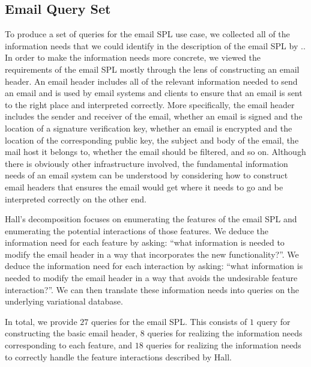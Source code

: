 \subsection{Email Query Set}
\label{sec:enron-qs}


To produce a set of queries for the email SPL use case, we collected all of
the information needs that we could identify in the description of the email
SPL by \citet{Hall05}.. In order to make the information needs more concrete, we
viewed the requirements of the email SPL mostly through the lens of
constructing an email header.
%
An email header includes all of the relevant information needed to send an
email and is used by email systems and clients to ensure that an email is sent to
the right place and interpreted correctly. 
More specifically, the email header
includes the sender and receiver of the email, whether an email is signed and
the location of a signature verification key, whether an email is encrypted and
the location of the corresponding public key, the subject and body of the
email, the mail host it belongs to, whether the email should be filtered,
and so on.
%
Although there is obviously other infrastructure involved, the fundamental
information needs of an email system can be understood by considering how to
construct email headers
 that ensures the email would get where it needs to go
 and be interpreted correctly on the other end.


Hall's decomposition focuses on enumerating the features of the email SPL and
enumerating the potential interactions of those features.
%
We deduce the information need for each feature by asking: ``what information
is needed to modify the email header in a way that incorporates the new
functionality?''. We deduce the information need for each interaction by
asking: ``what information is needed to modify the email header in a way that
avoids the undesirable feature interaction?''.
%
We can then translate these information needs into queries on the underlying
variational database.


In total, we provide $27$ queries for the email SPL.
%
%
This consists of $1$ query for constructing the basic email header, $8$ queries
for realizing the information needs corresponding to each feature, and $18$
queries for realizing the information needs to correctly handle the feature
interactions described by Hall.


